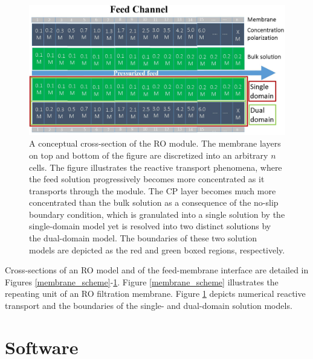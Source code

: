 \documentclass[fleqn,10pt]{wlscirep}
\begin{document}
\begin{figure}[h]
    \centering
    \includegraphics[width = \textwidth]{../images/supporting_information/single_dual_domain.jpg}
    \caption{
        A conceptual cross-section of the RO module. The membrane layers on top and bottom of the figure are discretized into an arbitrary $n$ cells. The figure illustrates the reactive transport phenomena, where the feed solution progressively becomes more concentrated as it transports through the module. The CP layer becomes much more concentrated than the bulk solution as a consequence of the no-slip boundary condition, which is granulated into a single solution by the single-domain model  yet is resolved into two distinct solutions by the dual-domain model. The boundaries of these two solution models are depicted as the red and green boxed regions, respectively. 
    }
    \label{single_dual_domain}
\end{figure}

Cross-sections of an RO model and of the feed-membrane interface are detailed in Figures \ref{membrane_scheme}-\ref{single_dual_domain}. Figure \ref{membrane_scheme} illustrates the repeating unit of an RO filtration membrane. Figure \ref{single_dual_domain} depicts numerical reactive transport and the boundaries of the single- and dual-domain solution models.

\section{Software}
\end{document}
